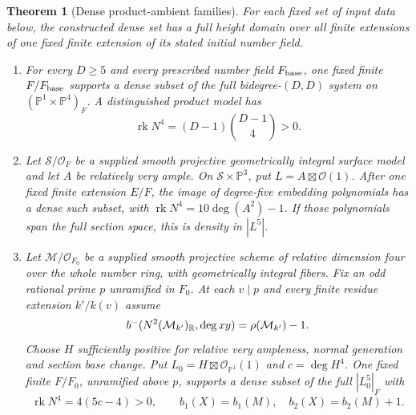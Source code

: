 \documentclass[11pt,a4paper]{article}
\newtheorem{theorem}{Theorem}[section]
\theoremstyle{definition}
\theoremstyle{remark}\newtheorem{remark}[theorem]{Remark}
\numberwithin{equation}{section}
\newcommand{\PP}{\mathbb P}\newcommand{\LL}{\mathbb L}
\newcommand{\rk}{\operatorname{rk}}\newcommand{\im}{\operatorname{im}}
\begin{document}
\begin{theorem}[Dense product-ambient families]\label{thm:dense-products}
For each fixed set of input data below, the constructed dense set
has a full height domain over all finite extensions of one fixed
finite extension of its stated initial number field.
\begin{enumerate}[label=\textup{(\roman*)}]
\item For every $D\geq5$ and every prescribed number field
$F_{\rm base}$, one fixed finite $F/F_{\rm base}$ supports a
dense subset of the full bidegree-$(D,D)$ system on
$(\PP^1\times\PP^4)_F$. A distinguished product model has
\[
 \rk N^4=(D-1)\binom{D-1}{4}>0.
\]
\item Let $\mathcal S/\mathcal O_F$ be a supplied smooth
projective geometrically integral surface model and let $A$ be
relatively very ample. On $\mathcal S\times\PP^3$, put
$L=A\boxtimes\mathcal O(1)$. After one fixed finite extension
$E/F$, the image of degree-five embedding polynomials has a
dense such subset, with
$\rk N^4=10\deg(A^2)-1$. If those polynomials span the full
section space, this is density in $|L^5|$.
\item Let $\mathcal M/\mathcal O_{F_0}$ be a supplied smooth
projective scheme of relative dimension four over the whole number
ring, with geometrically integral fibers. Fix an odd rational prime $p$ unramified
in $F_0$. At each $v\mid p$ and every finite residue extension
$k'/k(v)$ assume
\begin{equation}\label{eq:host-signature}
 b^-(N^2(\mathcal M_{k'})_\mathbb R,\deg xy)
                  =\rho(\mathcal M_{k'})-1.
\end{equation}
Choose $H$ sufficiently positive for relative very ampleness,
normal generation and section base change. Put
$L_0=H\boxtimes\mathcal O_{\PP^1}(1)$ and $c=\deg H^4$.
One fixed finite $F/F_0$, unramified above $p$, supports a dense
subset of the full $|L_0^5|_F$ with
\[
 \rk N^4=4(5c-4)>0,\qquad
 b_1(X)=b_1(M),\quad b_2(X)=b_2(M)+1.
\]
\end{enumerate}
\end{theorem}
\end{document}
